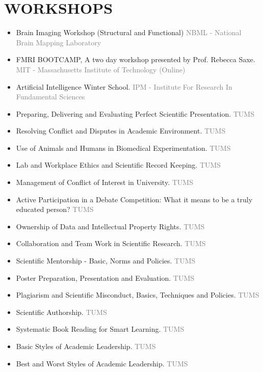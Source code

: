 \documentclass[10pt,a4paper,sans]{moderncv} %
\begin{document}
	\section{WORKSHOPS}
    \vspace{0.3em}
	\begin{itemize}
        \item Brain Imaging Workshop (Structural and Functional) \textcolor{gray}{ NBML - National Brain Mapping Laboratory }
        \item FMRI BOOTCAMP, A two day workshop presented by Prof. Rebecca Saxe. \textcolor{gray}{ MIT - Massachusetts Institute of Technology (Online) }
        \item Artificial Intelligence Winter School.  \textcolor{gray}{ IPM - Institute For Research In Fundamental Sciences }
        \item Preparing, Delivering and Evaluating Perfect Scientific Presentation. \textcolor{gray}{ TUMS }
        \item Resolving Conflict and Disputes in Academic Environment. \textcolor{gray}{ TUMS }
        \item Use of Animals and Humans in Biomedical Experimentation. \textcolor{gray}{ TUMS }
        \item Lab and Workplace Ethics and Scientific Record Keeping. \textcolor{gray}{ TUMS }
        \item Management of Conflict of Interest in University. \textcolor{gray}{ TUMS }
        \item Active Participation in a Debate Competition: What it means to be a truly educated person? \textcolor{gray}{ TUMS }
		\item Ownership of Data and Intellectual Property Rights. \textcolor{gray}{ TUMS }
        \item Collaboration and Team Work in Scientific Research.\textcolor{gray}{ TUMS }
        \item Scientific Mentorship - Basic, Norms and Policies. \textcolor{gray}{ TUMS }
        \item Poster Preparation, Presentation and Evaluation. \textcolor{gray}{ TUMS }
        \item Plagiarism and Scientific Misconduct, Basics, Techniques and Policies. \textcolor{gray}{ TUMS }
        \item Scientific Authorship. \textcolor{gray}{ TUMS }
        \item Systematic Book Reading for Smart Learning. \textcolor{gray}{ TUMS }
        \item Basic Styles of Academic Leadership. \textcolor{gray}{ TUMS }
        \item Best and Worst Styles of Academic Leadership. \textcolor{gray}{ TUMS }
	\end{itemize}
\end{document}
